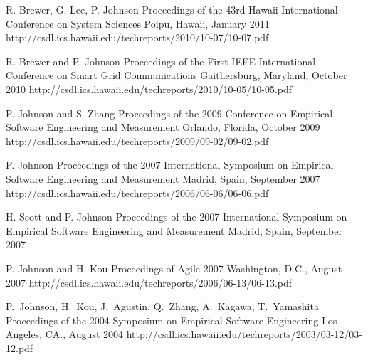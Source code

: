 \documentclass[11pt,letterpaper,sans]{moderncv} %
\begin{document}
          {R. Brewer, G. Lee, P. Johnson}
          {Proceedings of the 43rd Hawaii International Conference on System Sciences}
          {Poipu, Hawaii, January 2011}
          {http://csdl.ics.hawaii.edu/techreports/2010/10-07/10-07.pdf}

          {R. Brewer and P. Johnson}
          {Proceedings of the First IEEE International Conference on Smart Grid Communications}
          {Gaithersburg, Maryland, October 2010}
          {http://csdl.ics.hawaii.edu/techreports/2010/10-05/10-05.pdf}

          {P. Johnson and S. Zhang}
          {Proceedings of the 2009 Conference on Empirical Software Engineering and Measurement}
          {Orlando, Florida, October 2009}
          {http://csdl.ics.hawaii.edu/techreports/2009/09-02/09-02.pdf}

          {P. Johnson}
          {Proceedings of the 2007 International Symposium on Empirical Software Engineering and Measurement}
          {Madrid, Spain, September 2007}
          {http://csdl.ics.hawaii.edu/techreports/2006/06-06/06-06.pdf}

          {H. Scott and P. Johnson}
          {Proceedings of the 2007 International Symposium on Empirical Software Engineering and Measurement}
          {Madrid, Spain, September 2007}

          {P. Johnson and H. Kou}
          {Proceedings of Agile 2007}
          {Washington, D.C., August 2007}
          {http://csdl.ics.hawaii.edu/techreports/2006/06-13/06-13.pdf}

          {P.~Johnson, H.~Kou, J.~Agustin, Q.~Zhang, A.~Kagawa, T.~Yamashita}
          {Proceedings of the 2004 Symposium on Empirical Software Engineering}
          {Los Angeles, CA., August 2004}
          {http://csdl.ics.hawaii.edu/techreports/2003/03-12/03-12.pdf}
\end{document}

